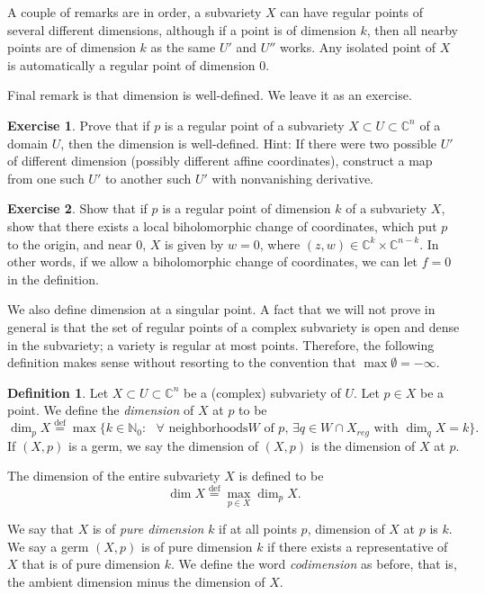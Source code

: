 \documentclass[12pt,openany]{book}
\newcommand{\C}{{\mathbb{C}}}
\newcommand{\N}{{\mathbb{N}}}
\newcommand{\myindex}[1]{#1\index{#1}}
\theoremstyle{plain}
\theoremstyle{remark}
\theoremstyle{definition}
\newtheorem{defn}[thm]{Definition}
\newenvironment{exbox}{%
    \def\FrameCommand{\vrule width 1pt \relax\hspace {10pt}}%
    \MakeFramed {\advance \hsize -\width \FrameRestore }%
}{%
    \endMakeFramed
}
\theoremstyle{exercise}
\newtheorem{exercise}{Exercise}[section]
\theoremstyle{example}
\begin{document}
A couple of remarks are in order, a subvariety $X$ can have
regular points of several different dimensions, although if a point
is of dimension $k$, then all nearby points are of dimension $k$
as the same $U'$ and $U''$ works.
Any isolated point of $X$ is automatically a regular point of dimension
0.

Final remark is that dimension is well-defined.  We leave it as an exercise.

\begin{exbox}
\begin{exercise}
Prove that if $p$ is a regular point of a subvariety $X \subset U \subset
\C^n$ of a domain $U$, then the dimension is well-defined.  Hint: If there were two possible
$U'$ of different dimension (possibly different affine coordinates), construct a map
from one such $U'$ to another such $U'$ with nonvanishing derivative.
\end{exercise}

\begin{exercise}
Show that if $p$ is a regular point of dimension $k$ of a subvariety $X$, show that there
exists a local biholomorphic change of coordinates, which put $p$ to the
origin, and near $0$, $X$ is given by $w=0$, where $(z,w) \in \C^{k} \times
\C^{n-k}$.  In other words, if we allow a biholomorphic change of
coordinates, we can let $f=0$ in the definition.
\end{exercise}
\end{exbox}

We also define dimension at a singular point.
A fact that we will not prove in general is that
the set of regular points of a complex
subvariety is open and dense in the subvariety; a
variety is regular at most points.  Therefore, the 
following definition makes sense without resorting to
the convention that $\max \emptyset = -\infty$.

\begin{defn}
Let $X \subset U \subset \C^n$ be a (complex) subvariety of $U$.  Let $p \in
X$ be a point.  We define the \emph{\myindex{dimension}} of $X$ at $p$
to be
%
\begin{equation*}
\dim_p X \overset{\text{def}}{=}
\max \bigl\{ k \in \N_0 : \text{ $\forall$ neighborhoods
$W$ of $p$, $\exists q \in W \cap X_{\mathit{reg}}$ with $\dim_q X = k$}
\bigr\} .
\end{equation*}
If $(X,p)$ is a germ, we say the dimension of $(X,p)$ is the dimension of
$X$ at $p$.

The dimension of the entire subvariety $X$ is defined to be
%
\begin{equation*}
\dim X \overset{\text{def}}{=}
\max_{p \in X} \dim_p X .
\end{equation*}

We say that $X$ is of \emph{\myindex{pure dimension}} $k$ if at
all points $p$, dimension of $X$ at $p$ is $k$.  
We say a germ $(X,p)$ is of pure dimension $k$ if there exists a representative
of $X$ that is of pure dimension $k$.
We define the word \emph{codimension} as before, that is, the
ambient dimension minus the dimension of $X$.
\end{defn}
\end{document}

